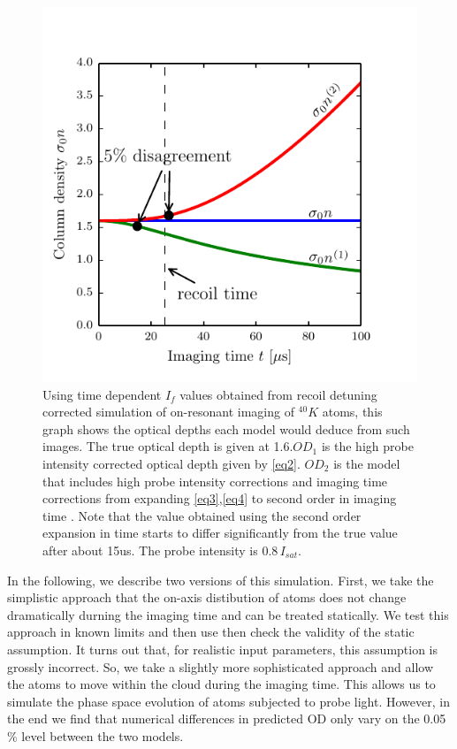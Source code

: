 \documentclass[12pt]{iopart}
\begin{document}
\begin{figure}
	\includegraphics[scale=0.57]{figure2}
\caption{Using time dependent $I_f$ values obtained from recoil detuning corrected simulation of on-resonant imaging of $^{40}K$ atoms, this graph shows the optical depths each model would deduce from such images. The true optical depth is given at 1.6.$OD_1$ is the high probe intensity corrected optical depth given by \ref{eq2}. $OD_2$ is the model that includes high probe intensity corrections and imaging time corrections from expanding \ref{eq3},\ref{eq4} to second order in imaging time \cite{LJLthesis}. Note that the value obtained using the second order expansion in time starts to differ significantly from the true value after about 15us. The probe intensity is $0.8\, I_{sat}$. }  
\label{fig:ODcorrections}
\end{figure}
\par In the following, we describe two versions of this simulation. First, we take the simplistic approach that the on-axis distibution of atoms does not change dramatically durning the imaging time and can be treated statically. We test this approach in known limits and then use then check the validity of the static assumption. It turns out that, for realistic input parameters, this assumption is grossly incorrect. So, we take a slightly more sophisticated approach and allow the atoms to move within the cloud during the imaging time. This allows us to simulate the phase space evolution of atoms subjected to probe light. However,   
in the end we find that numerical differences in predicted OD only vary on the 0.05$\%$ level between the two models. 
\end{document}
